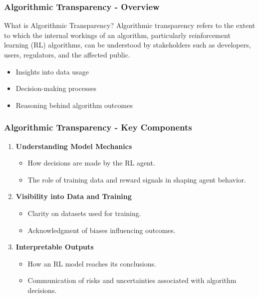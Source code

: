 \documentclass[aspectratio=169]{beamer}
\begin{document}
\begin{frame}[fragile]
    \frametitle{Algorithmic Transparency - Overview}
    \begin{block}{What is Algorithmic Transparency?}
        Algorithmic transparency refers to the extent to which the internal workings of an algorithm, particularly reinforcement learning (RL) algorithms, can be understood by stakeholders such as developers, users, regulators, and the affected public.
    \end{block}
    \begin{itemize}
        \item Insights into data usage
        \item Decision-making processes
        \item Reasoning behind algorithm outcomes
    \end{itemize}
\end{frame}

\begin{frame}[fragile]
    \frametitle{Algorithmic Transparency - Key Components}
    \begin{enumerate}
        \item \textbf{Understanding Model Mechanics}
        \begin{itemize}
            \item How decisions are made by the RL agent.
            \item The role of training data and reward signals in shaping agent behavior.
        \end{itemize}
        
        \item \textbf{Visibility into Data and Training}
        \begin{itemize}
            \item Clarity on datasets used for training.
            \item Acknowledgment of biases influencing outcomes.
        \end{itemize}

        \item \textbf{Interpretable Outputs}
        \begin{itemize}
            \item How an RL model reaches its conclusions.
            \item Communication of risks and uncertainties associated with algorithm decisions.
        \end{itemize}
    \end{enumerate}
\end{frame}
\end{document}
